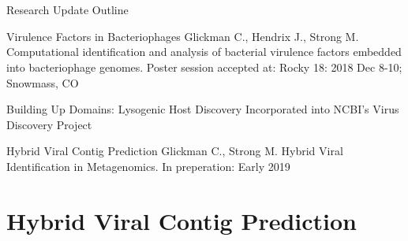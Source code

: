 \documentclass[11pt, xcolor=table]{beamer}
\begin{document}
\section{}
	\begin{frame}{Research Update Outline}
	\begin{block}{\textcolor{black!50}{Virulence Factors in Bacteriophages}}
	\textcolor{black!50}{\tiny{Glickman C., Hendrix J., Strong M. Computational identification and analysis of bacterial virulence factors embedded into bacteriophage genomes. Poster session accepted at: Rocky 18: 2018 Dec 8-10; Snowmass, CO}}
	\end{block}
	
	\begin{block}{\textcolor{black!50}{Building Up Domains: Lysogenic Host Discovery}}
  \textcolor{black!50}{Incorporated into NCBI's Virus Discovery Project}
	\end{block}

	\begin{block}{Hybrid Viral Contig Prediction}
	\tiny{Glickman C., Strong M. Hybrid Viral Identification in Metagenomics. In preperation: Early 2019}
	\end{block}
	\end{frame}
	
	
\section{Hybrid Viral Contig Prediction}
\subsection{}
\end{document}
